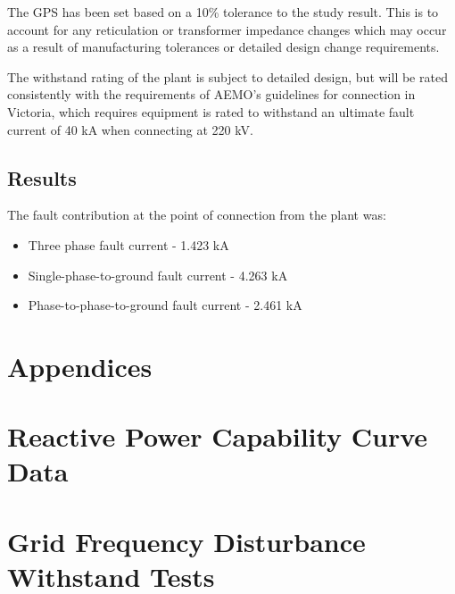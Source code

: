 \documentclass{../grid-link-report}
\newcommand{\projectassetsdir}{../project-assets}
\begin{document}
	The \ac{GPS} has been set based on a 10\% tolerance to the study result. This is to account for any reticulation or transformer impedance changes which may occur as a result of manufacturing tolerances or detailed design change requirements. 
	
	The withstand rating of the plant is subject to detailed design, but will be rated consistently with the requirements of AEMO's guidelines for connection in Victoria, which requires equipment is rated to withstand an ultimate fault current of 40 kA when connecting at 220 kV.
	
	\subsection{Results}
	
	The fault contribution at the point of connection from the plant was:
	\begin{itemize}
		\item Three phase fault current - 1.423 kA
		\item Single-phase-to-ground fault current - 4.263 kA
		\item Phase-to-phase-to-ground fault current - 2.461 kA
	\end{itemize}

	
	
	
	

	
	\newpage
	\appendix
	\renewcommand{\thesection}{\Alph{section}}  %
	\setcounter{section}{0}  %
	
	\section*{Appendices}
	
	\section{Reactive Power Capability Curve Data}
	\label{Reactive Power Capability Curve Data}
	
	\section{Grid Frequency Disturbance Withstand Tests}
	\label{Grid Frequency Disturbance Withstand Tests}
	
\end{document}
